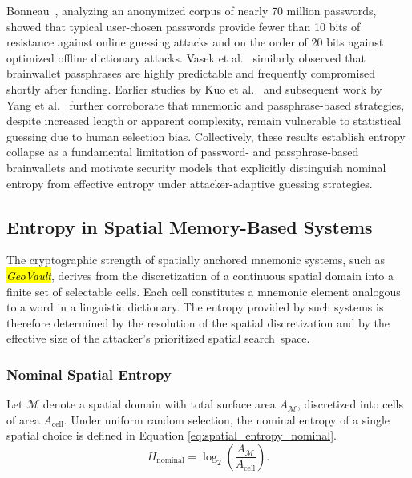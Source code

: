 \documentclass[mathematics,article,accept,pdftex,moreauthors]{Definitions/mdpi}
\begin{document}
Bonneau~\cite{Bonneau2012}, analyzing an anonymized corpus of nearly 70 million passwords, showed that typical user-chosen passwords provide fewer than 10 bits of resistance against online guessing attacks and on the order of 20 bits against optimized offline dictionary attacks. Vasek et al.~\cite{Vasek2017} similarly observed that brainwallet passphrases are highly predictable and frequently compromised shortly after funding. Earlier studies by Kuo et al.~\cite{Kuo2006} and subsequent work by Yang et al.~\cite{Yang2016} further corroborate that mnemonic and passphrase-based strategies, despite increased length or apparent complexity, remain vulnerable to statistical guessing due to human selection bias. Collectively, these results establish entropy collapse as a fundamental limitation of password- and passphrase-based brainwallets and motivate security models that explicitly distinguish nominal entropy from effective entropy under attacker-adaptive guessing strategies.

\subsection{Entropy in Spatial Memory-Based Systems\label{sec3.2}}

The cryptographic strength of spatially anchored mnemonic systems, such as \textit{\hl{GeoVault}}, derives from the discretization of a continuous spatial domain into a finite set of selectable cells. Each cell constitutes a mnemonic element analogous to a word in a linguistic dictionary. The entropy provided by such systems is therefore determined by the resolution of the spatial discretization and by the effective size of the attacker’s prioritized spatial \mbox{search space.}

\subsubsection{Nominal Spatial Entropy}

Let $\mathcal{M}$ denote a spatial domain with total surface area $A_{\mathcal{M}}$, discretized into cells of area $A_{\text{cell}}$. Under uniform random selection, the nominal entropy of a single spatial choice is defined in Equation \eqref{eq:spatial_entropy_nominal}.
\begin{equation}
H_{\text{nominal}} = \log_2\!\left(\frac{A_{\mathcal{M}}}{A_{\text{cell}}}\right).
\label{eq:spatial_entropy_nominal}
\end{equation}
\end{document}
